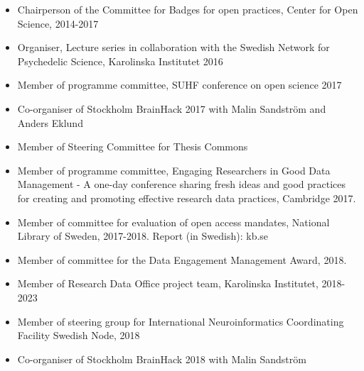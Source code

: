 \documentclass[10pt,a4paper,twocolumn]{article}
\begin{document}
\begin{itemize}
    \item Chairperson of the Committee for Badges for open practices, Center for Open Science, 2014-2017
    
    

    \item Organiser, Lecture series in collaboration with the Swedish Network for Psychedelic Science, Karolinska Institutet 2016
    
    

    \item Member of programme committee, SUHF conference on open science 2017
    
    

    \item Co-organiser of Stockholm BrainHack 2017 with Malin Sandström and Anders Eklund
    
    

    \item Member of Steering Committee for Thesis Commons
    
    

    \item Member of programme committee, Engaging Researchers in Good Data Management - A one-day conference sharing fresh ideas and good practices for creating and promoting effective research data practices, Cambridge 2017.
    
    

    \item Member of committee for evaluation of open access mandates, National Library of Sweden, 2017-2018. Report (in Swedish): kb.se
    
    

    \item Member of committee for the Data Engagement Management Award, 2018.
    
    

    \item Member of Research Data Office project team, Karolinska Institutet, 2018-2023
    
    

    \item Member of steering group for International Neuroinformatics Coordinating Facility Swedish Node, 2018
    
    

    \item Co-organiser of Stockholm BrainHack 2018 with Malin Sandström
    
    


\end{itemize}
\end{document}
